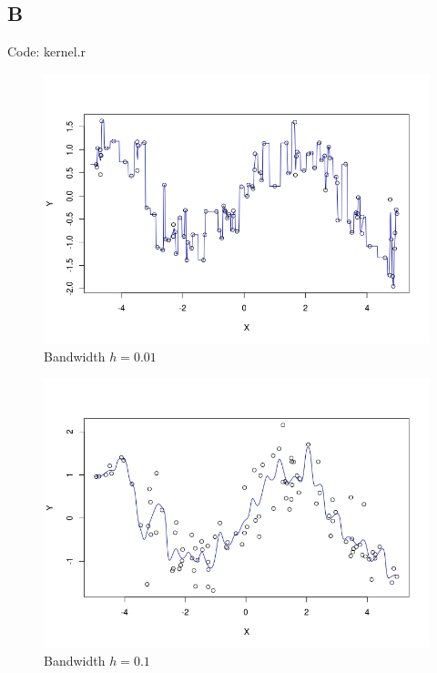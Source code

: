 \documentclass{article}
\begin{document}
\subsection*{B}
Code: kernel.r


\begin{figure}[h!]
\includegraphics[width = \textwidth]{h001.jpeg}
\caption{Bandwidth \(h = 0.01\)}
\end{figure}

\begin{figure}[h!]
\includegraphics[width = \textwidth]{h01.jpeg}
\caption{Bandwidth \(h = 0.1\)}
\end{figure}
\end{document}
